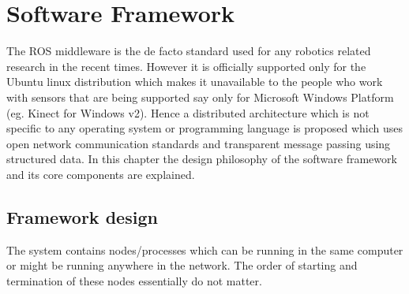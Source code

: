 
\chapter{Software Framework} %

\label{Chapter3} %

The ROS \cite{quigley2009ros} middleware is the de facto standard used for any robotics related research in the recent times. However it is officially supported only for the Ubuntu linux distribution which makes it unavailable to the people who work with sensors that are being supported say only for Microsoft Windows Platform (eg. Kinect for Windows v2). Hence a distributed architecture which is not specific to any operating system or programming language is proposed which uses open network communication standards and transparent message passing using structured data. In this chapter the design philosophy of the software framework and its core components are explained.
\section{Framework design}		
The system contains nodes/processes which can be running in the same computer or might be running anywhere in the network. The order of starting and termination of these nodes essentially do not matter.
